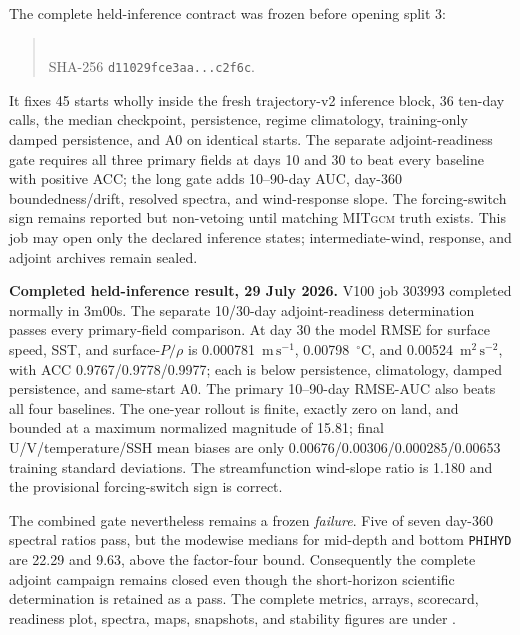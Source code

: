 \documentclass[11pt]{article}
\newcommand{\MITgcm}{\textsc{MITgcm}}
\begin{document}
The complete held-inference contract was frozen before opening split 3:
\begin{quote}
\\
SHA-256 \texttt{d11029fce3aa...c2f6c}.
\end{quote}
It fixes 45 starts wholly inside the fresh trajectory-v2 inference block, 36 ten-day
calls, the median checkpoint, persistence, regime climatology, training-only damped
persistence, and A0 on identical starts.  The separate adjoint-readiness gate requires
all three primary fields at days 10 and 30 to beat every baseline with positive ACC;
the long gate adds 10--90-day AUC, day-360 boundedness/drift, resolved spectra, and
wind-response slope.  The forcing-switch sign remains reported but non-vetoing until
matching \MITgcm{} truth exists.  This job may open only the declared inference states;
intermediate-wind, response, and adjoint archives remain sealed.

\textbf{Completed held-inference result, 29 July 2026.}  V100 job 303993
completed normally in 3m00s.  The separate 10/30-day adjoint-readiness
determination passes every primary-field comparison.  At day 30 the model
RMSE for surface speed, SST, and surface-\(P/\rho\) is
0.000781~\(\mathrm{m\,s^{-1}}\), 0.00798~\({}^{\circ}\mathrm{C}\), and
0.00524~\(\mathrm{m^2\,s^{-2}}\), with ACC
0.9767/0.9778/0.9977; each is below persistence, climatology, damped
persistence, and same-start A0.  The primary 10--90-day RMSE-AUC also beats
all four baselines.  The one-year rollout is finite, exactly zero on land, and
bounded at a maximum normalized magnitude of 15.81; final U/V/temperature/SSH
mean biases are only 0.00676/0.00306/0.000285/0.00653 training standard
deviations.  The streamfunction wind-slope ratio is 1.180 and the provisional
forcing-switch sign is correct.

The combined gate nevertheless remains a frozen \emph{failure}.  Five of seven
day-360 spectral ratios pass, but the modewise medians for mid-depth and bottom
\texttt{PHIHYD} are 22.29 and 9.63, above the factor-four bound.  Consequently
the complete adjoint campaign remains closed even though the short-horizon
scientific determination is retained as a pass.  The complete metrics, arrays,
scorecard, readiness plot, spectra, maps, snapshots, and stability figures are
under
.
\end{document}

